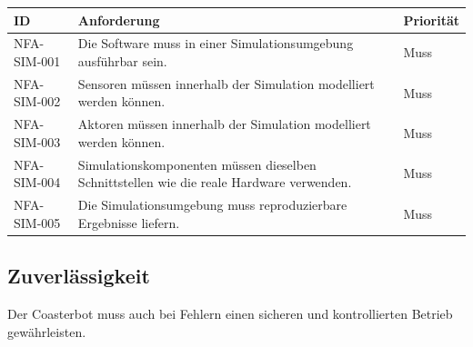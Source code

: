 \begin{longtable}[]{@{}
  >{\raggedright\arraybackslash}p{}
  >{\raggedright\arraybackslash}p{}
  >{\raggedright\arraybackslash}p{}@{}}
\toprule\noalign{}
\begin{minipage}[b]{\linewidth}\raggedright
ID
\end{minipage} & \begin{minipage}[b]{\linewidth}\raggedright
Anforderung
\end{minipage} & \begin{minipage}[b]{\linewidth}\raggedright
Priorität
\end{minipage} \\
\midrule\noalign{}
\endhead
\bottomrule\noalign{}
\endlastfoot
NFA-SIM-001 & Die Software muss in einer Simulationsumgebung ausführbar
sein. & Muss \\
NFA-SIM-002 & Sensoren müssen innerhalb der Simulation modelliert werden
können. & Muss \\
NFA-SIM-003 & Aktoren müssen innerhalb der Simulation modelliert werden
können. & Muss \\
NFA-SIM-004 & Simulationskomponenten müssen dieselben Schnittstellen wie
die reale Hardware verwenden. & Muss \\
NFA-SIM-005 & Die Simulationsumgebung muss reproduzierbare Ergebnisse
liefern. & Muss \\
\end{longtable}

\subsection{Zuverlässigkeit}\label{zuverluxe4ssigkeit}

Der Coasterbot muss auch bei Fehlern einen sicheren und kontrollierten
Betrieb gewährleisten.

